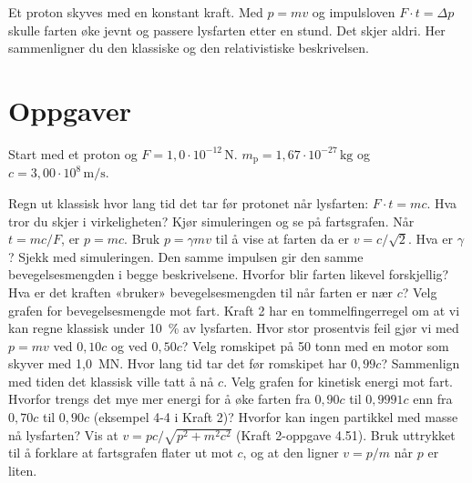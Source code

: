 \documentclass[11pt]{article}
\begin{document}

Et proton skyves med en konstant kraft. Med $p = mv$ og impulsloven $F \cdot t = Δp$ skulle farten øke jevnt og passere lysfarten etter en stund. Det skjer aldri. Her sammenligner du den klassiske og den relativistiske beskrivelsen.

\section*{Oppgaver}

Start med et proton og $F = 1{,}0 \cdot 10^{-12}\,\mathrm{N}$. $m_{\mathrm{p}} = 1{,}67 \cdot 10^{-27}\,\mathrm{kg}$ og $c = 3{,}00 \cdot 10^{8}\,\mathrm{m/s}$.

\begin{oppgaveliste}
\oppgave {}Regn ut klassisk hvor lang tid det tar før protonet når lysfarten: $F \cdot t = mc$. Hva tror du skjer i virkeligheten? Kjør simuleringen og se på fartsgrafen.
\svar
\oppgave {}Når $t = mc/F$, er $p = mc$. Bruk $p = γmv$ til å vise at farten da er $v = c/\sqrt{2}$. Hva er $γ$? Sjekk med simuleringen.
\svar
\oppgave {}Den samme impulsen gir den samme bevegelsesmengden i begge beskrivelsene. Hvorfor blir farten likevel forskjellig? Hva er det kraften «bruker» bevegelsesmengden til når farten er nær $c$?
\svar
\oppgave {}Velg grafen for bevegelsesmengde mot fart. Kraft 2 har en tommelfingerregel om at vi kan regne klassisk under 10~\% av lysfarten. Hvor stor prosentvis feil gjør vi med $p = mv$ ved $0{,}10c$ og ved $0{,}50c$?
\svar
\oppgave {}Velg romskipet på 50 tonn med en motor som skyver med 1,0~MN. Hvor lang tid tar det før romskipet har $0{,}99c$? Sammenlign med tiden det klassisk ville tatt å nå $c$.
\svar
\oppgave {}Velg grafen for kinetisk energi mot fart. Hvorfor trengs det mye mer energi for å øke farten fra $0{,}90c$ til $0{,}9991c$ enn fra $0{,}70c$ til $0{,}90c$ (eksempel 4-4 i Kraft 2)? Hvorfor kan ingen partikkel med masse nå lysfarten?
\svar
\oppgave {}Vis at $v = pc / \sqrt{p^{2} + m^{2}c^{2}}$ (Kraft 2-oppgave 4.51). Bruk uttrykket til å forklare at fartsgrafen flater ut mot $c$, og at den ligner $v = p/m$ når $p$ er liten.
\svar
\end{oppgaveliste}
\end{document}
